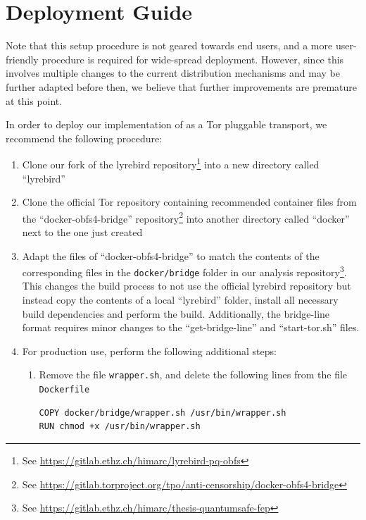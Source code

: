 \section{Deployment Guide} \label{sec:deployment}

Note that this setup procedure is not geared towards end users, and a more user-friendly procedure is required for wide-spread deployment.
However, since this involves multiple changes to the current distribution mechanisms and \drivel{} may be further adapted before then, we believe that further improvements are premature at this point.

In order to deploy our implementation of \drivel{} as a Tor pluggable transport, we recommend the following procedure:
\begin{enumerate}
    \item Clone our fork of the lyrebird repository\footnote{See \url{https://gitlab.ethz.ch/himarc/lyrebird-pq-obfs}} into a new directory called ``lyrebird''
    
    \item Clone the official Tor repository containing recommended container files from the ``docker-obfs4-bridge'' repository\footnote{See \url{https://gitlab.torproject.org/tpo/anti-censorship/docker-obfs4-bridge}} into another directory called ``docker'' next to the one just created
    
    \item Adapt the files of ``docker-obfs4-bridge'' to match the contents of the corresponding files in the \texttt{docker/bridge} folder in our analysis repository\footnote{See \url{https://gitlab.ethz.ch/himarc/thesis-quantumsafe-fep}}. This changes the build process to not use the official lyrebird repository but instead copy the contents of a local ``lyrebird'' folder, install all necessary build dependencies and perform the build. Additionally, the bridge-line format requires minor changes to the ``get-bridge-line'' and ``start-tor.sh'' files.

    \item For production use, perform the following additional steps:
    \begin{enumerate}
        \item Remove the file \texttt{wrapper.sh}, and delete the following lines from the file \texttt{Dockerfile}
        \begin{lstlisting}
COPY docker/bridge/wrapper.sh /usr/bin/wrapper.sh
RUN chmod +x /usr/bin/wrapper.sh
        \end{lstlisting}


\end{enumerate}
\end{enumerate}
